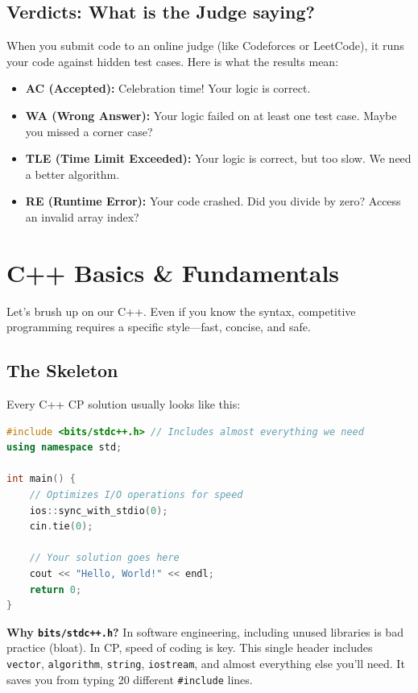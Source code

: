 \documentclass[12pt, a4paper]{report}
\begin{document}
\section{Verdicts: What is the Judge saying?}
When you submit code to an online judge (like Codeforces or LeetCode), it runs your code against hidden test cases. Here is what the results mean:
\begin{itemize}
    \item \textbf{AC (Accepted):} Celebration time! Your logic is correct.
    \item \textbf{WA (Wrong Answer):} Your logic failed on at least one test case. Maybe you missed a corner case?
    \item \textbf{TLE (Time Limit Exceeded):} Your logic is correct, but too slow. We need a better algorithm.
    \item \textbf{RE (Runtime Error):} Your code crashed. Did you divide by zero? Access an invalid array index?
\end{itemize}

\chapter{C++ Basics & Fundamentals}
Let's brush up on our C++. Even if you know the syntax, competitive programming requires a specific style—fast, concise, and safe.

\section{The Skeleton}
Every C++ CP solution usually looks like this:

\begin{lstlisting}[language=C++]
#include <bits/stdc++.h> // Includes almost everything we need
using namespace std;

int main() {
    // Optimizes I/O operations for speed
    ios::sync_with_stdio(0);
    cin.tie(0);

    // Your solution goes here
    cout << "Hello, World!" << endl;
    return 0;
}
\end{lstlisting}

\begin{hintbox}
\textbf{Why \texttt{bits/stdc++.h}?}
In software engineering, including unused libraries is bad practice (bloat). In CP, speed of coding is key. This single header includes \texttt{vector}, \texttt{algorithm}, \texttt{string}, \texttt{iostream}, and almost everything else you'll need. It saves you from typing 20 different \texttt{\#include} lines.
\end{hintbox}
\end{document}
